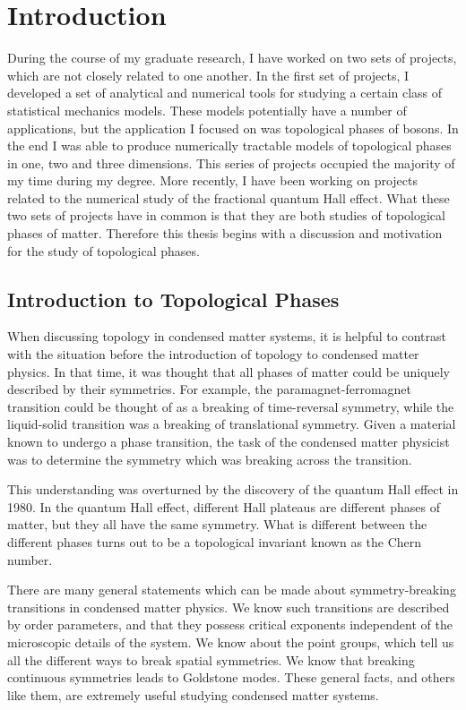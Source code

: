 \chapter{Introduction}

During the course of my graduate research, I have worked on two sets of projects, which are not closely related to one another. In the first set of projects, I developed a set of analytical and numerical tools for studying a certain class of statistical mechanics models. These models potentially have a number of applications, but the application I focused on was topological phases of bosons. In the end I was able to produce numerically tractable models of topological phases in one, two and three dimensions. This series of projects occupied the majority of my time during my degree. 
More recently, I have been working on projects related to the numerical study of the fractional quantum Hall effect. What these two sets of projects have in common is that they are both studies of topological phases of matter. Therefore this thesis begins with a discussion and motivation for the study of topological phases.

\section{Introduction to Topological Phases}

When discussing topology in condensed matter systems, it is helpful to contrast with the situation before the introduction of topology to condensed matter physics. In that time, it was thought that all phases of matter could be uniquely described by their symmetries. For example, the paramagnet-ferromagnet transition could be thought of as a breaking of time-reversal symmetry, while the liquid-solid transition was a breaking of translational symmetry. Given a material known to undergo a phase transition, the task of the condensed matter physicist was to determine the symmetry which was breaking across the transition.

This understanding was overturned by the discovery of the quantum Hall effect in 1980.\cite{vonKlitzing} In the quantum Hall effect, different Hall plateaus are different phases of matter, but they all have the same symmetry. What is different between the different phases turns out to be a topological invariant known as the Chern number. 

There are many general statements which can be made about symmetry-breaking transitions in condensed matter physics. We know such transitions are described by order parameters, and that they possess critical exponents independent of the microscopic details of the system. We know about the point groups, which tell us all the different ways to break spatial symmetries. We know that breaking continuous symmetries leads to Goldstone modes. These general facts, and others like them, are extremely useful studying condensed matter systems. 

